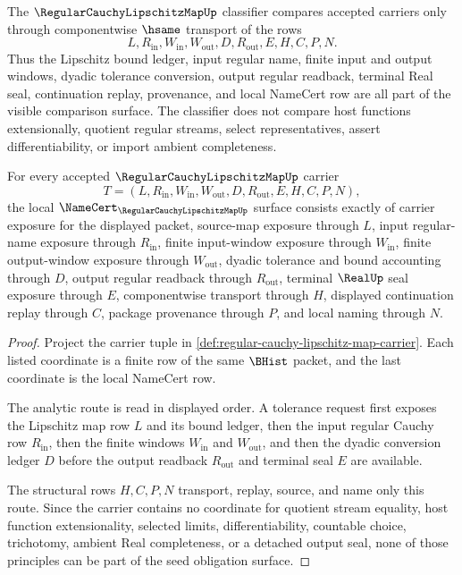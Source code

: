 \begin{definition}
\label{def:regular-cauchy-lipschitz-map-classifier}
The $\RegularCauchyLipschitzMapUp$ classifier compares accepted carriers only through componentwise $\hsame$ transport of the rows
$$
L,R_{\mathrm{in}},W_{\mathrm{in}},W_{\mathrm{out}},D,R_{\mathrm{out}},E,H,C,P,N.
$$
Thus the Lipschitz bound ledger, input regular name, finite input and output windows, dyadic tolerance conversion, output regular readback, terminal Real seal, continuation replay, provenance, and local NameCert row are all part of the visible comparison surface. The classifier does not compare host functions extensionally, quotient regular streams, select representatives, assert differentiability, or import ambient completeness.
\end{definition}

\begin{theorem}
\label{thm:regular-cauchy-lipschitz-map-namecert-obligations}
For every accepted $\RegularCauchyLipschitzMapUp$ carrier
$$
T=(L,R_{\mathrm{in}},W_{\mathrm{in}},W_{\mathrm{out}},D,R_{\mathrm{out}},E,H,C,P,N),
$$
the local $\NameCert_{\RegularCauchyLipschitzMapUp}$ surface consists exactly of carrier exposure for the displayed packet, source-map exposure through $L$, input regular-name exposure through $R_{\mathrm{in}}$, finite input-window exposure through $W_{\mathrm{in}}$, finite output-window exposure through $W_{\mathrm{out}}$, dyadic tolerance and bound accounting through $D$, output regular readback through $R_{\mathrm{out}}$, terminal $\RealUp$ seal exposure through $E$, componentwise transport through $H$, displayed continuation replay through $C$, package provenance through $P$, and local naming through $N$.
\end{theorem}
\begin{proof}
Project the carrier tuple in \autoref{def:regular-cauchy-lipschitz-map-carrier}. Each listed coordinate is a finite row of the same $\BHist$ packet, and the last coordinate is the local NameCert row.

The analytic route is read in displayed order. A tolerance request first exposes the Lipschitz map row $L$ and its bound ledger, then the input regular Cauchy row $R_{\mathrm{in}}$, then the finite windows $W_{\mathrm{in}}$ and $W_{\mathrm{out}}$, and then the dyadic conversion ledger $D$ before the output readback $R_{\mathrm{out}}$ and terminal seal $E$ are available.

The structural rows $H,C,P,N$ transport, replay, source, and name only this route. Since the carrier contains no coordinate for quotient stream equality, host function extensionality, selected limits, differentiability, countable choice, trichotomy, ambient Real completeness, or a detached output seal, none of those principles can be part of the seed obligation surface.
\end{proof}

